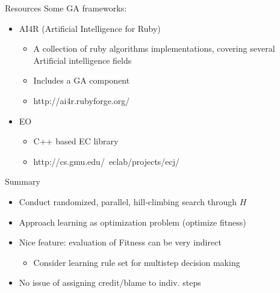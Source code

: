 \documentclass[%
pdf,
colorBG,
slideColor,
tcrico,
]{prosper}
\begin{document}
\begin{slide}{Resources}
Some GA frameworks:
	\begin{itemize}
	
	\item AI4R (Artificial Intelligence for Ruby)
		\begin{itemize}
		\item A collection of ruby algorithms implementations, covering several Artificial intelligence fields
		\item Includes a GA component
		\item http://ai4r.rubyforge.org/
		\end{itemize}
\item EO
		\begin{itemize}
		\item C++ based EC library
		\item http://cs.gmu.edu/~eclab/projects/ecj/
		\end{itemize}
	\end{itemize}
\end{slide}


\begin{slide}{Summary}


\begin{itemize}
 
\item Conduct randomized, parallel, hill-climbing search through $H$
\item Approach learning as optimization problem (optimize fitness)
\item Nice feature: evaluation of Fitness can be very indirect
	\begin{itemize}
	\item Consider learning rule set for multistep decision making
\end{itemize}
 \item No issue of assigning credit/blame to indiv. steps
\end{itemize}
\end{slide}
\end{document}
